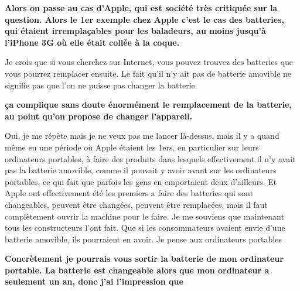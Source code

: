 \begin{small}


\textbf{Alors on passe au cas d'Apple, qui est société très critiquée sur la question. Alors le 1er exemple chez Apple c'est le cas des batteries, qui étaient irremplaçables pour les baladeurs, au moins jusqu’à l'iPhone 3G où elle était collée à la coque.}
\smallbreak


Je crois que si vous cherchez sur Internet, vous pouvez trouvez des batteries que vous pourrez remplacer ensuite. Le fait qu'il n'y ait pas de batterie amovible ne signifie pas que l'on ne puisse pas changer la batterie. 

\textbf{ça complique sans doute énormément le remplacement de la batterie, au point qu'on propose de changer l'appareil.}
\smallbreak


Oui, je me répète mais je ne veux pas me lancer là-dessus, mais il y a quand même eu une période où Apple étaient les 1ers, en particulier sur leurs ordinateurs portables, à faire des produits dans lesquels effectivement il n'y avait pas la batterie amovible, comme il pouvait y avoir avant sur les ordinateurs portables, ce qui fait que parfois les gens en emportaient deux d'ailleurs. Et Apple ont effectivement été les premiers a faire des batteries qui sont changeables, peuvent être changées, peuvent être remplacées, mais il faut complètement ouvrir la machine pour le faire. Je me souviens que maintenant tous les constructeurs l'ont fait. Que si les consommateurs avaient envie d'une batterie amovible, ils pourraient en avoir. Je pense aux ordinateurs portables

\textbf{Concrètement je pourrais vous sortir la batterie de mon ordinateur portable. La batterie est changeable alors que mon ordinateur a seulement un an, donc j'ai l'impression que}
\smallbreak



\end{small}
